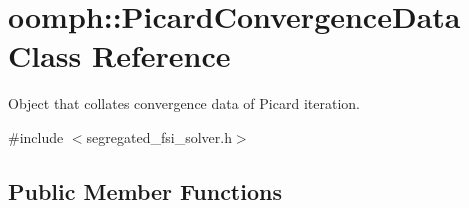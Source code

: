 \hypertarget{classoomph_1_1PicardConvergenceData}{}\section{oomph\+:\+:Picard\+Convergence\+Data Class Reference}
\label{classoomph_1_1PicardConvergenceData}


Object that collates convergence data of Picard iteration.  




{\ttfamily \#include $<$segregated\+\_\+fsi\+\_\+solver.\+h$>$}

\subsection*{Public Member Functions}
